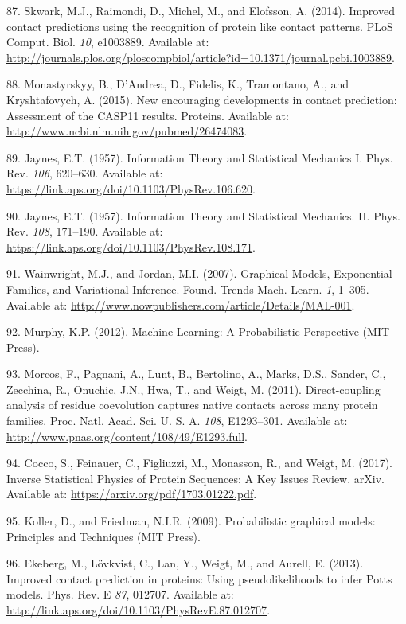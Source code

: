 \documentclass[11pt,a4paper,twoside]{book}
\theoremstyle{definition}
\theoremstyle{definition}
\theoremstyle{remark}
\begin{document}
\hypertarget{ref-Skwark2014a}{}
87. Skwark, M.J., Raimondi, D., Michel, M., and Elofsson, A. (2014).
Improved contact predictions using the recognition of protein like
contact patterns. PLoS Comput. Biol. \emph{10}, e1003889. Available at:
\url{http://journals.plos.org/ploscompbiol/article?id=10.1371/journal.pcbi.1003889}.

\hypertarget{ref-Monastyrskyy2015}{}
88. Monastyrskyy, B., D'Andrea, D., Fidelis, K., Tramontano, A., and
Kryshtafovych, A. (2015). New encouraging developments in contact
prediction: Assessment of the CASP11 results. Proteins. Available at:
\url{http://www.ncbi.nlm.nih.gov/pubmed/26474083}.

\hypertarget{ref-Jaynes1957a}{}
89. Jaynes, E.T. (1957). Information Theory and Statistical Mechanics I.
Phys. Rev. \emph{106}, 620--630. Available at:
\url{https://link.aps.org/doi/10.1103/PhysRev.106.620}.

\hypertarget{ref-Jaynes1957b}{}
90. Jaynes, E.T. (1957). Information Theory and Statistical Mechanics.
II. Phys. Rev. \emph{108}, 171--190. Available at:
\url{https://link.aps.org/doi/10.1103/PhysRev.108.171}.

\hypertarget{ref-Wainwright2007}{}
91. Wainwright, M.J., and Jordan, M.I. (2007). Graphical Models,
Exponential Families, and Variational Inference. Found. Trends Mach.
Learn. \emph{1}, 1--305. Available at:
\url{http://www.nowpublishers.com/article/Details/MAL-001}.

\hypertarget{ref-Murphy2012}{}
92. Murphy, K.P. (2012). Machine Learning: A Probabilistic Perspective
(MIT Press).

\hypertarget{ref-Morcos2011}{}
93. Morcos, F., Pagnani, A., Lunt, B., Bertolino, A., Marks, D.S.,
Sander, C., Zecchina, R., Onuchic, J.N., Hwa, T., and Weigt, M. (2011).
Direct-coupling analysis of residue coevolution captures native contacts
across many protein families. Proc. Natl. Acad. Sci. U. S. A.
\emph{108}, E1293--301. Available at:
\url{http://www.pnas.org/content/108/49/E1293.full}.

\hypertarget{ref-Cocco2017}{}
94. Cocco, S., Feinauer, C., Figliuzzi, M., Monasson, R., and Weigt, M.
(2017). Inverse Statistical Physics of Protein Sequences: A Key Issues
Review. arXiv. Available at: \url{https://arxiv.org/pdf/1703.01222.pdf}.

\hypertarget{ref-Koller2009}{}
95. Koller, D., and Friedman, N.I.R. (2009). Probabilistic graphical
models: Principles and Techniques (MIT Press).

\hypertarget{ref-Ekeberg2013}{}
96. Ekeberg, M., Lövkvist, C., Lan, Y., Weigt, M., and Aurell, E.
(2013). Improved contact prediction in proteins: Using pseudolikelihoods
to infer Potts models. Phys. Rev. E \emph{87}, 012707. Available at:
\url{http://link.aps.org/doi/10.1103/PhysRevE.87.012707}.
\end{document}
